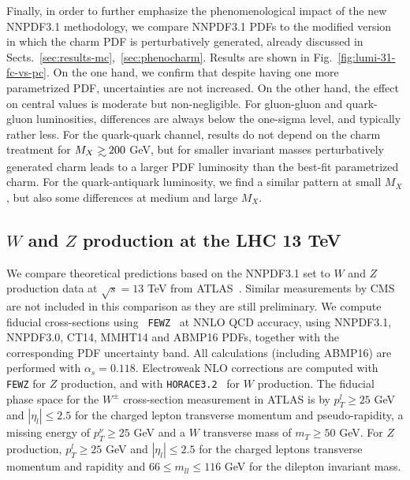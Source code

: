 Finally, in order to further emphasize the phenomenological impact of
the new NNPDF3.1 methodology, we compare NNPDF3.1 PDFs to the modified
version in which the charm PDF is perturbatively generated, already
discussed in Sects.~\ref{sec:results-mc},~\ref{sec:phenocharm}.
Results are shown in Fig.~\ref{fig:lumi-31-fc-vs-pc}.
On the one hand, we confirm that despite having one more parametrized
PDF, uncertainties are not increased. On the other hand, the effect on
central values is moderate but non-negligible. For
 gluon-gluon and quark-gluon luminosities, differences are always below
the one-sigma level, and typically rather
less.
%
For the quark-quark channel, results do not depend on the charm
treatment
for $M_X\gsim 200$ GeV, but for smaller invariant masses
perturbatively generated charm 
leads to a larger PDF luminosity than the best-fit parametrized charm.
%
For the quark-antiquark luminosity, we find a similar pattern at small
$M_X$, but  also 
some differences at medium and large $M_X$.




\clearpage

\subsection{$W$ and $Z$ production at the LHC 13 TeV}
\label{sec:pheno13TeV}

We compare 
theoretical predictions based on the NNPDF3.1 set to  $W$ and $Z$
production data at $\sqrt{s}=13$ TeV from  
ATLAS~\cite{Aad:2016naf}. Similar measurements by CMS~\cite{CMS-PAS-SMP-15-004} are not 
included in this comparison as they are still preliminary.
%
We compute  fiducial cross-sections using {\tt
  FEWZ}~\cite{Gavin:2012sy} at NNLO QCD 
     accuracy, using NNPDF3.1, NNPDF3.0, CT14, MMHT14
     and ABMP16 PDFs, together with the corresponding PDF uncertainty band. All calculations 
(including ABMP16) are performed with $\alpha_s=0.118$.
     Electroweak NLO corrections are  computed with
     {\tt FEWZ} for $Z$  production, and with {\tt HORACE3.2}~\cite{CarloniCalame:2007cd} for
     $W$  production.
    The fiducial phase space for the $W^{\pm}$ cross-section
    measurement in ATLAS is 
    by $p_T^l\ge 25$ GeV and $|\eta_l|\le 2.5$ for the charged lepton
    transverse momentum and pseudo-rapidity, a missing energy of
    $p_T^\nu\ge 25$ GeV 
    and a $W$ transverse mass of $m_T\ge 50$ GeV.
    For $Z$  production, 
    $p_T^l\ge 25$ GeV and $|\eta_l|\le 2.5$ for the charged leptons transverse
    momentum and rapidity and $66\le m_{ll} \le 116$ GeV for the dilepton
    invariant mass.
         
